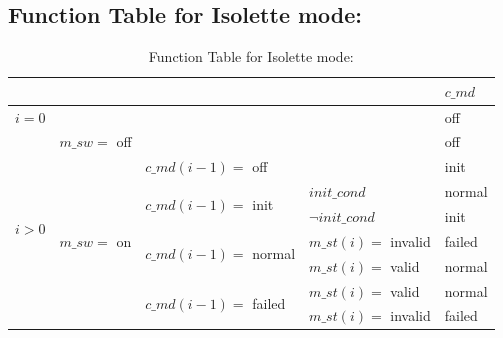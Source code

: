 \documentclass[fontsize=12pt,paper=letter,twoside]{scrartcl}
\begin{document}
\subsection{Function Table for Isolette mode: }
\begin{table}[htb]
\centering
\begin{tabular}{llll|l|}
\cline{5-5}
                                                        &                                                  &                                                           &                    & $c\_md$  \\ \hline
\multicolumn{4}{|l|}{$i = 0$}                                                                                                                                                                 & off    \\ \hline
\multicolumn{1}{|l|}{\multirow{8}{*}{$i > 0$}} & \multicolumn{3}{l|}{$m\_sw =$ off}                                                                                                  & off    \\ \cline{2-5}
\multicolumn{1}{|l|}{}                                  & \multicolumn{1}{l|}{\multirow{7}{*}{$m\_sw =$ on}} & \multicolumn{2}{l|}{$c\_md(i-1) =$ off}                                          & init   \\ \cline{3-5}
\multicolumn{1}{|l|}{}                                  & \multicolumn{1}{l|}{}                            & \multicolumn{1}{l|}{\multirow{2}{*}{$c\_md(i-1) =$ init}}   & $init\_cond$ \footnotemark        & normal \\ \cline{4-5}
\multicolumn{1}{|l|}{}                                  & \multicolumn{1}{l|}{}                            & \multicolumn{1}{l|}{}                                     & $\neg init\_cond$     & init   \\ \cline{3-5}
\multicolumn{1}{|l|}{}                                  & \multicolumn{1}{l|}{}                            & \multicolumn{1}{l|}{\multirow{2}{*}{$c\_md(i-1) =$ normal}} & $m\_st(i) =$ invalid & failed   \\ \cline{4-5}
\multicolumn{1}{|l|}{}                                  & \multicolumn{1}{l|}{}                            & \multicolumn{1}{l|}{}                                     & $m\_st(i) =$ valid   & normal \\ \cline{3-5}
\multicolumn{1}{|l|}{}                                  & \multicolumn{1}{l|}{}                            & \multicolumn{1}{l|}{\multirow{2}{*}{$c\_md(i-1) =$ failed}}   & $m\_st(i) =$ valid   & normal \\ \cline{4-5}
\multicolumn{1}{|l|}{}                                  & \multicolumn{1}{l|}{}                            & \multicolumn{1}{l|}{}                                     & $m\_st(i) =$ invalid & failed   \\ \hline
\end{tabular}
\caption{Function Table for Isolette mode: }
\end{table}
\end{document}
